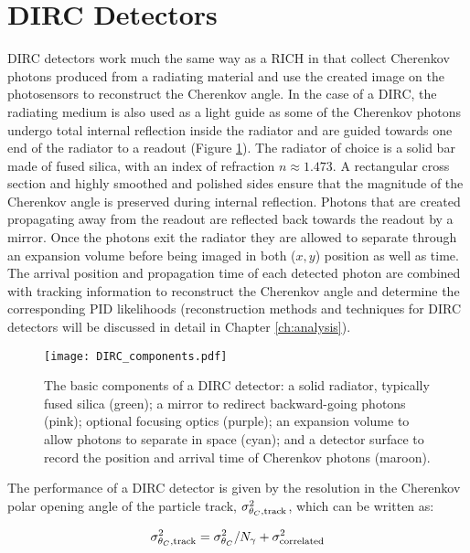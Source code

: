 \section{DIRC Detectors}
DIRC detectors work much the same way as a RICH in that collect Cherenkov photons produced from a radiating material and use the created image on the photosensors to reconstruct the Cherenkov angle. In the case of a DIRC, the radiating medium is also used as a light guide as some of the Cherenkov photons undergo total internal reflection inside the radiator and are guided towards one end of the radiator to a readout (Figure \ref{fig:dircbasics}). The radiator of choice is a solid bar made of fused silica, with an index of refraction $n \approx 1.473$. A rectangular cross section and highly smoothed and polished sides ensure that the magnitude of the Cherenkov angle is preserved during internal reflection. Photons that are created propagating away from the readout are reflected back towards the readout by a mirror. Once the photons exit the radiator they are allowed to separate through an expansion volume before being imaged in both ($x, y$) position as well as time. The arrival position and propagation time of each detected photon are combined with tracking information to reconstruct the Cherenkov angle and determine the corresponding PID likelihoods (reconstruction methods and techniques for DIRC detectors will be discussed in detail in Chapter \ref{ch:analysis}).

\begin{figure}[ht]
	\centering
	\texttt{[image: DIRC\_components.pdf]}
	\caption{The basic components of a DIRC detector: a solid radiator, typically fused silica (green); a mirror to redirect backward-going photons (pink); optional focusing optics (purple); an expansion volume to allow photons to separate in space (cyan); and a detector surface to record the position and arrival time of Cherenkov photons (maroon).}
	\label{fig:dircbasics}
\end{figure}

The performance of a DIRC detector is given by the resolution in the Cherenkov polar opening angle of the particle track, $\sigma_{\theta_{C},\text{track}}^2$, which can be written as:

\begin{equation}
	\sigma_{\theta_{C},\text{track}}^2 = \sigma_{\theta_{C}}^2 / N_{\gamma} + \sigma_{\text{correlated}}^2
	\label{eq:performance}
\end{equation}

